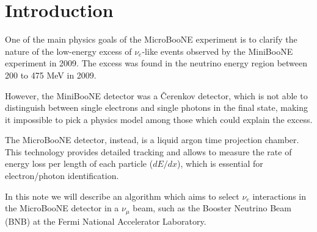
\section{Introduction}
One of the main physics goals of the MicroBooNE experiment is to clarify the nature of the low-energy excess of $\nu_{e}$-like events observed by the MiniBooNE experiment in 2009. The excess was found in the neutrino energy region between 200 to 475 MeV in 2009.

However, the MiniBooNE detector was a \v{C}erenkov detector, which is not able to distinguish between single electrons and single photons in the final state, making it impossible to pick a physics model among those which could explain the excess.

The MicroBooNE detector, instead, is a liquid argon time projection chamber. This technology provides detailed tracking and allows to measure the rate of energy loss per length of each particle ($dE/dx$), which is essential for electron/photon identification.

In this note we will describe an algorithm which aims to select $\nu_{e}$ interactions in the MicroBooNE detector in a $\nu_{\mu}$ beam, such as the Booster Neutrino Beam (BNB) at the Fermi National Accelerator Laboratory.
